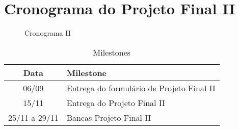\section{Cronograma do Projeto Final II}

\begin{figure}[ht]
    \begin{center}
    
    \caption{Cronograma II}
    \label{fig:cronograma-planejado-II}
    \end{center}
\end{figure}

\begin{table}[h]
    \centering
    \caption{Milestones}
    \begin{tabular}{|c|l|}
        \hline
        \textbf{Data} & \textbf{Milestone} \\
        \hline
        06/09 & Entrega do formulário de Projeto Final II \\
        15/11 & Entrega do Projeto Final II \\
        25/11 a 29/11 & Bancas Projeto Final II \\
        \hline
    \end{tabular}
\end{table}